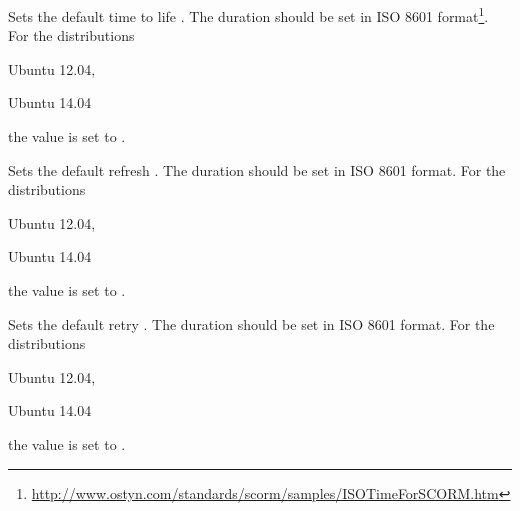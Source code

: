 
Sets the default time to life . The duration should be set in 
ISO 8601 format\footnote{\url{http://www.ostyn.com/standards/scorm/samples/ISOTimeForSCORM.htm}}.
For the distributions
\begin{inparaitem}
\item[\TheDistribution{ubuntu}] Ubuntu 12.04,
\item[\TheDistribution{ubuntu}] Ubuntu 14.04
\end{inparaitem}
the value is set to .


Sets the default refresh . The duration should be set in 
ISO 8601 format.
For the distributions
\begin{inparaitem}
\item[\TheDistribution{ubuntu}] Ubuntu 12.04,
\item[\TheDistribution{ubuntu}] Ubuntu 14.04
\end{inparaitem}
the value is set to .


Sets the default retry . The duration should be set in 
ISO 8601 format.
For the distributions
\begin{inparaitem}
\item[\TheDistribution{ubuntu}] Ubuntu 12.04,
\item[\TheDistribution{ubuntu}] Ubuntu 14.04
\end{inparaitem}
the value is set to .


